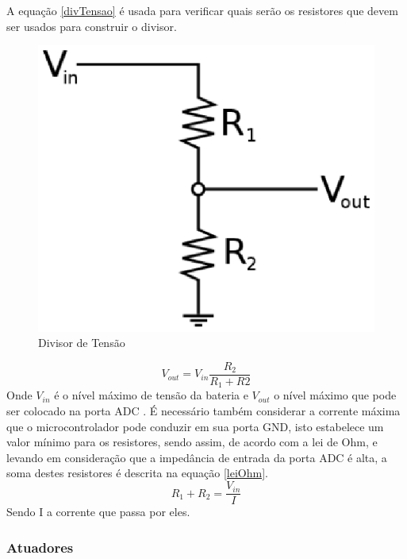 A equação \ref{divTensao} é usada para verificar quais serão os resistores que devem ser usados para construir o divisor.

\begin{figure}[H]
 \centering
   \includegraphics[keepaspectratio=true,scale=0.8]{figuras/divisortensao.eps}
 \caption{Divisor de Tensão}
 \label{divisor_tensao}
\end{figure}

\begin{equation}
\label{divTensao}
	V_{out}=V_{in}\frac{R_{2}}{R_{1}+R{2}}
\end{equation}
Onde $V_{in}$ é o nível máximo de tensão da bateria e $V_{out}$ o nível máximo que pode ser colocado na porta ADC \cite{EVERDEEN}. É necessário também considerar a corrente máxima que o microcontrolador pode conduzir em sua porta GND, isto estabelece um valor mínimo para os resistores, sendo assim, de acordo com a lei de Ohm, e levando em consideração que a impedância de entrada da porta ADC é alta, a soma destes resistores é descrita na equação \ref{leiOhm}.
\begin{equation}
\label{leiOhm}
	R_{1}+R_{2}=\frac{V_{in}}{I}
\end{equation}
Sendo I a corrente que passa por eles.

\subsubsection{Atuadores}

